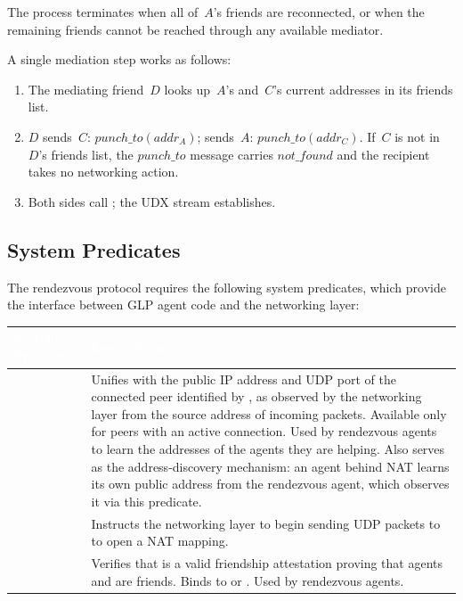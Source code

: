 The process terminates when all of~$A$'s friends are reconnected, or when the remaining friends cannot be reached through any available mediator.

A single mediation step works as follows:
\begin{enumerate}
\item The mediating friend~$D$ looks up~$A$'s and~$C$'s current addresses in its friends list.
\item $D$ sends~$C$: $\mathit{punch\_to}(\mathit{addr}_A)$; sends~$A$: $\mathit{punch\_to}(\mathit{addr}_C)$.  If~$C$ is not in~$D$'s friends list, the $\mathit{punch\_to}$ message carries $\mathit{not\_found}$ and the recipient takes no networking action.
\item Both sides call ; the UDX stream establishes.
\end{enumerate}

\subsection{System Predicates}
\label{sec:rv-predicates}
The rendezvous protocol requires the following system predicates, which provide the interface between GLP agent code and the networking layer:

\begin{longtable}{L{4cm} L{9.5cm}}
\toprule
{}
\textcolor{white}{\textbf{System Predicate}} &
\textcolor{white}{\textbf{Description}} \\
\midrule
\endhead
{} & Unifies  with the public IP address and UDP port of the connected peer identified by , as observed by the networking layer from the source address of incoming packets.  Available only for peers with an active connection.  Used by rendezvous agents to learn the addresses of the agents they are helping.  Also serves as the address-discovery mechanism: an agent behind NAT learns its own public address from the rendezvous agent, which observes it via this predicate. \\
 & Instructs the networking layer to begin sending UDP packets to  to open a NAT mapping. \\
 & Verifies that  is a valid friendship attestation proving that agents  and  are friends.  Binds  to  or .  Used by rendezvous agents. \\
\bottomrule
\end{longtable}

